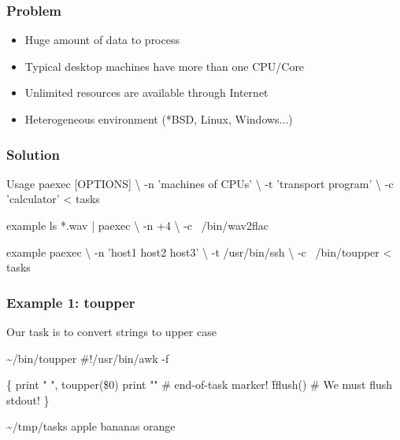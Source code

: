 \documentclass[hyperref={colorlinks=true}]{beamer}
\begin{document}

\begin{frame}
  \titlepage
\end{frame}

\begin{frame}{}
  \frametitle{Problem}
  \begin{block}{}
    \begin{itemize}
    \item Huge amount of data to process
    \item Typical desktop machines have more than one CPU/Core
    \item Unlimited resources are available through Internet
    \item Heterogeneous environment (*BSD, Linux, Windows...)
    \end{itemize}
  \end{block}
\end{frame}

\begin{frame}[fragile]
  \frametitle{Solution}

  \begin{block}{}
      \begin{CodeLarge}{Usage}
paexec [OPTIONS] \textbackslash
  -n 'machines of CPUs' \textbackslash
  -t 'transport program' \textbackslash
  -c 'calculator' < tasks
      \end{CodeLarge}
      \begin{CodeLarge}{example}
ls *.wav | paexec \textbackslash
  -n +4 \textbackslash
  -c ~/bin/wav2flac
      \end{CodeLarge}
      \begin{CodeLarge}{example}
paexec \textbackslash
  -n 'host1 host2 host3' \textbackslash
  -t /usr/bin/ssh \textbackslash
  -c ~/bin/toupper < tasks
      \end{CodeLarge}
  \end{block}
\end{frame}

\begin{frame}[fragile]
  \frametitle{Example 1: toupper}
  Our task is to convert strings to upper case
  \begin{block}{}
      \begin{CodeLarge}{\~{}/bin/toupper}
#!/usr/bin/awk -f

\{
   print " ", toupper(\$0)
   print ""  # end-of-task marker!
   \h{fflush()}  # We must flush stdout!
\}
      \end{CodeLarge}
  \end{block}
  \begin{block}{}
      \begin{CodeLarge}{\~{}/tmp/tasks}
apple
bananas
orange
      \end{CodeLarge}
  \end{block}
\end{frame}
\end{document}
